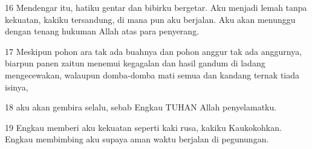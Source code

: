 \par 16 Mendengar itu, hatiku gentar dan bibirku bergetar. Aku menjadi lemah tanpa kekuatan, kakiku tersandung, di mana pun aku berjalan. Aku akan menunggu dengan tenang hukuman Allah atas para penyerang.
\par 17 Meskipun pohon ara tak ada buahnya dan pohon anggur tak ada anggurnya, biarpun panen zaitun menemui kegagalan dan hasil gandum di ladang mengecewakan, walaupun domba-domba mati semua dan kandang ternak tiada isinya,
\par 18 aku akan gembira selalu, sebab Engkau TUHAN Allah penyelamatku.
\par 19 Engkau memberi aku kekuatan seperti kaki rusa, kakiku Kaukokohkan. Engkau membimbing aku supaya aman waktu berjalan di pegunungan.



